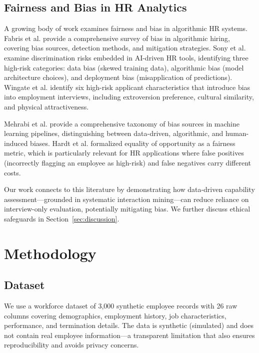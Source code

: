 \documentclass[twocolumn]{article}
\begin{document}
\subsection{Fairness and Bias in HR Analytics}

A growing body of work examines fairness and bias in algorithmic HR systems. Fabris et al. \cite{fabris2025fairness} provide a comprehensive survey of bias in algorithmic hiring, covering bias sources, detection methods, and mitigation strategies. Sony et al. \cite{sony2025bias} examine discrimination risks embedded in AI-driven HR tools, identifying three high-risk categories: data bias (skewed training data), algorithmic bias (model architecture choices), and deployment bias (misapplication of predictions). Wingate et al. \cite{wingate2024bias} identify six high-risk applicant characteristics that introduce bias into employment interviews, including extroversion preference, cultural similarity, and physical attractiveness.

Mehrabi et al. \cite{mehrabi2021survey} provide a comprehensive taxonomy of bias sources in machine learning pipelines, distinguishing between data-driven, algorithmic, and human-induced biases. Hardt et al. \cite{hardt2016equality} formalized equality of opportunity as a fairness metric, which is particularly relevant for HR applications where false positives (incorrectly flagging an employee as high-risk) and false negatives carry different costs.

Our work connects to this literature by demonstrating how data-driven capability assessment---grounded in systematic interaction mining---can reduce reliance on interview-only evaluation, potentially mitigating bias. We further discuss ethical safeguards in Section~\ref{sec:discussion}.

\section{Methodology}
\label{sec:methodology}

\subsection{Dataset}

We use a workforce dataset of 3,000 synthetic employee records with 26 raw columns covering demographics, employment history, job characteristics, performance, and termination details. The data is synthetic (simulated) and does not contain real employee information---a transparent limitation that also ensures reproducibility and avoids privacy concerns.
\end{document}
